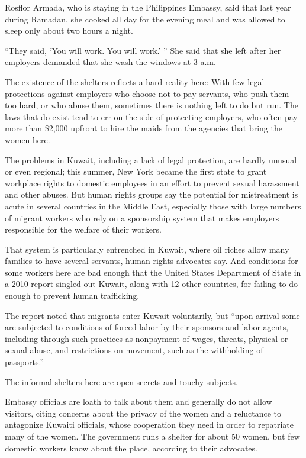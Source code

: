 ﻿\documentclass[12pt]{article}
\begin{document}
Rosflor Armada, who is staying in the Philippines Embassy, said that last year during Ramadan, she
cooked all day for the evening meal and was allowed to sleep only about two hours a night.

``They said, `You will work. You will work.' '' She said that she left after her employers demanded
that she wash the windows at 3 a.m.

The existence of the shelters reflects a hard reality here: With few legal protections against
employers who choose not to pay servants, who push them too hard, or who abuse them, sometimes there
is nothing left to do but run. The laws that do exist tend to err on the side of protecting
employers, who often pay more than \$2,000 upfront to hire the maids from the agencies that bring
the women here.

The problems in Kuwait, including a lack of legal protection, are hardly unusual or even regional;
this summer, New York became the first state to grant workplace rights to domestic employees in an
effort to prevent sexual harassment and other abuses. But human rights groups say the potential for
mistreatment is acute in several countries in the Middle East, especially those with large numbers
of migrant workers who rely on a sponsorship system that makes employers responsible for the welfare
of their workers.

That system is particularly entrenched in Kuwait, where oil riches allow many families to have
several servants, human rights advocates say. And conditions for some workers here are bad enough
that the United States Department of State in a 2010 report singled out Kuwait, along with 12 other
countries, for failing to do enough to prevent human trafficking.

The report noted that migrants enter Kuwait voluntarily, but ``upon arrival some are subjected to
conditions of forced labor by their sponsors and labor agents, including through such practices as
nonpayment of wages, threats, physical or sexual abuse, and restrictions on movement, such as the
withholding of passports.''

The informal shelters here are open secrets and touchy subjects.

Embassy officials are loath to talk about them and generally do not allow visitors, citing concerns
about the privacy of the women and a reluctance to antagonize Kuwaiti officials, whose cooperation
they need in order to repatriate many of the women. The government runs a shelter for about 50
women, but few domestic workers know about the place, according to their advocates.
\end{document}

